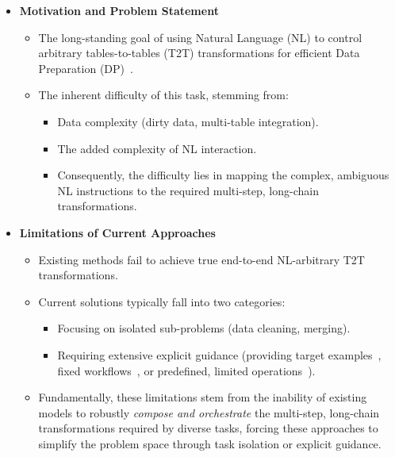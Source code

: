 \begin{itemize}
    \item \textbf{Motivation and Problem Statement}
    \begin{itemize}
        \item The long-standing goal of using Natural Language (NL) to control arbitrary tables-to-tables (T2T) transformations for efficient Data Preparation (DP)~\cite{jin2025elt}.
        \item The inherent difficulty of this task, stemming from:
        \begin{itemize}
            \item Data complexity (\eg dirty data, multi-table integration).
            \item The added complexity of NL interaction.
            \item Consequently, the difficulty lies in mapping the complex, ambiguous NL instructions to the required multi-step, long-chain transformations.
        \end{itemize}
    \end{itemize}

    \item \textbf{Limitations of Current Approaches}
    \begin{itemize}
        \item Existing methods fail to achieve true end-to-end NL-\nlwhat arbitrary T2T transformations.
        \item Current solutions typically fall into two categories:
        \begin{itemize}
            \item Focusing on isolated sub-problems (\eg data cleaning, merging).
            \item Requiring extensive explicit guidance (\eg providing target examples~\cite{he2018transform}, fixed workflows~\cite{ge2025text}, or predefined, limited operations~\cite{DBLP:journals/pvldb/LiHYWC23}).
        \end{itemize}
        \item Fundamentally, these limitations stem from the inability of existing models to robustly \textit{compose and orchestrate} the multi-step, long-chain transformations required by diverse tasks, forcing these approaches to simplify the problem space through task isolation or explicit guidance.
    \end{itemize}


\end{itemize}
